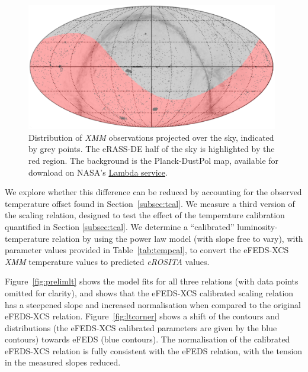 \documentclass[fleqn,usenatbib]{mnras}
\begin{document}
\begin{figure}
    \centering
    \includegraphics[width=0.98\textwidth]{images/XCS_eRASSd.png}
    \caption[]{Distribution of {\em XMM} observations projected over the sky, indicated by grey points. The eRASS-DE half of the sky is highlighted by the red region. The background is the Planck-DustPol \citep[][]{dustpol} map, available for download on NASA's \href{http://lambda.gsfc.nasa.gov/data/footprint-maps/Planck_DustPol_Amp_256.fits.gz
}{Lambda service}.} 
    \label{fig:germanerassxmm}
\end{figure}

We explore whether this difference can be reduced by accounting for the observed temperature offset found in Section~\ref{subsec:tcal}. We measure a third version of the scaling relation, designed to test the effect of the temperature calibration quantified in Section \ref{subsec:tcal}.  We determine a ``calibrated'' luminosity-temperature relation by using the power law model (with slope free to vary), with parameter values provided in Table~\ref{tab:tempcal}, to convert the eFEDS-XCS {\em XMM} temperature values to predicted {\em eROSITA} values.

Figure~\ref{fig:prelimlt} shows the model fits for all three relations (with data points omitted for clarity), and shows that the eFEDS-XCS calibrated scaling relation has a steepened slope and increased normalisation when compared to the original eFEDS-XCS relation.  Figure~\ref{fig:ltcorner} shows a shift of the contours and distributions (the eFEDS-XCS calibrated parameters are given by the blue contours) towards eFEDS (blue contours).  The normalisation of the calibrated eFEDS-XCS relation is fully consistent with the eFEDS relation, with the tension in the measured slopes reduced.  

\end{document}
